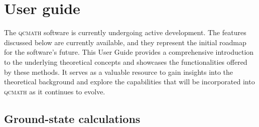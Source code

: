 \documentclass[aip,jcp,reprint,noshowkeys,superscriptaddress]{revtex4-1}
\newcommand{\qcmath}{\textsc{qcmath}\xspace}
\begin{document}
\section{User guide}
The \qcmath software is currently undergoing active development. The features discussed below are currently available, and they represent the initial roadmap for the software's future. This User Guide provides a comprehensive introduction to the underlying theoretical concepts and showcases the functionalities offered by these methods. \cite{SzaboBook,JensenBook,HelgakerBook,MartinBook,FetterBook} It serves as a valuable resource to gain insights into the theoretical background and explore the capabilities that will be incorporated into \qcmath as it continues to evolve.

\subsection{Ground-state calculations}

\end{document}
